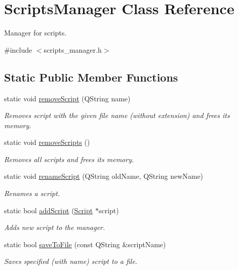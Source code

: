 \hypertarget{class_scripts_manager}{\section{Scripts\-Manager Class Reference}
\label{class_scripts_manager}
}


Manager for scripts.  




{\ttfamily \#include $<$scripts\-\_\-manager.\-h$>$}

\subsection*{Static Public Member Functions}
\begin{DoxyCompactItemize}
\item 
static void \hyperlink{class_scripts_manager_a99ddfb07ac002907cee3b2a5b102abad}{remove\-Script} (Q\-String name)
\begin{DoxyCompactList}\small\item\em Removes script with the given file name (without extension) and frees its memory. \end{DoxyCompactList}\item 
static void \hyperlink{class_scripts_manager_a137f7089f471de89c5d1344d3b5781cd}{remove\-Scripts} ()
\begin{DoxyCompactList}\small\item\em Removes all scripts and frees its memory. \end{DoxyCompactList}\item 
static void \hyperlink{class_scripts_manager_a5ac54ad842f4522eca2dbf7bcb6ad19e}{rename\-Script} (Q\-String old\-Name, Q\-String new\-Name)
\begin{DoxyCompactList}\small\item\em Renames a script. \end{DoxyCompactList}\item 
static bool \hyperlink{class_scripts_manager_a67b361d78d35092340feaf556b57565d}{add\-Script} (\hyperlink{class_script}{Script} $\ast$script)
\begin{DoxyCompactList}\small\item\em Adds new script to the manager. \end{DoxyCompactList}\item 
static bool \hyperlink{class_scripts_manager_ad4cd01aab1d6015db90cbca5fae306cf}{save\-To\-File} (const Q\-String \&script\-Name)
\begin{DoxyCompactList}\small\item\em Saves specified (with name) script to a file. \end{DoxyCompactList}\item 

\end{DoxyCompactItemize}
